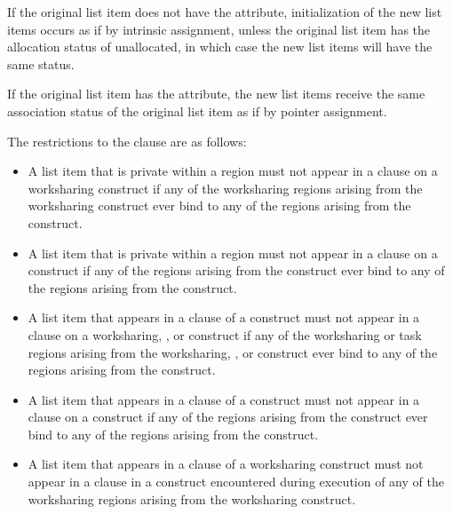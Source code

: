 {{{{\fortranspecificstart
If the original list item does not have the  attribute, initialization of the new 
list items occurs as if by intrinsic assignment, unless the original list item has the 
allocation status of unallocated, in which case the new list items will have the
same status.

If the original list item has the  attribute, the new list items receive the same 
association status of the original list item as if by pointer assignment.
\fortranspecificend

\restrictions
The restrictions to the  clause are as follows:

\begin{itemize}
\item A list item that is private within a  region must
not appear in a  clause on a worksharing construct
if any of the worksharing regions arising
from the worksharing construct ever bind to any of the
 regions arising from the  construct.

\item A list item that is private within a  region must not appear in a 
 clause on a  construct if any of the  
regions arising from the  construct ever bind to any of the  
regions arising from the  construct.

\item A list item that appears in a  clause of a  
construct must not appear in a  clause on a worksharing, , 
or  construct if any of the worksharing or task regions arising from 
the worksharing, , or  construct ever bind to any of the 
 regions arising from the  construct.

\item A list item that appears in a  clause of a  construct must not 
appear in a  clause on a  construct if any of the 
 regions arising from the  construct ever bind to any of 
the  regions arising from the  construct. 

\item A list item that appears in a  clause of a worksharing construct must not 
appear in a  clause in a  construct encountered during execution 
of any of the worksharing regions arising from the worksharing construct.


\end{itemize}}}}}
